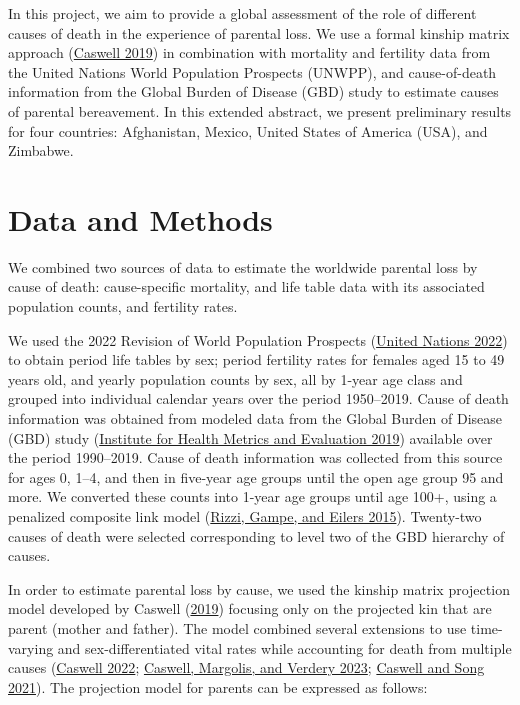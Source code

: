 \documentclass[
  11pt,
  letterpaper,
]{article}
\begin{document}
In this project, we aim to provide a global assessment of the role of different causes of death in the experience of parental loss. We use a formal kinship matrix approach (\protect\hyperlink{ref-caswell2019formal}{Caswell 2019}) in combination with mortality and fertility data from the United Nations World Population Prospects (UNWPP), and cause-of-death information from the Global Burden of Disease (GBD) study to estimate causes of parental bereavement. In this extended abstract, we present preliminary results for four countries: Afghanistan, Mexico, United States of America (USA), and Zimbabwe.

\hypertarget{data-and-methods}{%
\section{Data and Methods}\label{data-and-methods}}

We combined two sources of data to estimate the worldwide parental loss by cause of death: cause-specific mortality, and life table data with its associated population counts, and fertility rates.

We used the 2022 Revision of World Population Prospects (\protect\hyperlink{ref-united2022world}{United Nations 2022}) to obtain period life tables by sex; period fertility rates for females aged 15 to 49 years old, and yearly population counts by sex, all by 1-year age class and grouped into individual calendar years over the period 1950--2019. Cause of death information was obtained from modeled data from the Global Burden of Disease (GBD) study (\protect\hyperlink{ref-ihme2019gbd}{Institute for Health Metrics and Evaluation 2019}) available over the period 1990--2019. Cause of death information was collected from this source for ages 0, 1--4, and then in five-year age groups until the open age group 95 and more. We converted these counts into 1-year age groups until age 100+, using a penalized composite link model (\protect\hyperlink{ref-rizzi2015efficient}{Rizzi, Gampe, and Eilers 2015}). Twenty-two causes of death were selected corresponding to level two of the GBD hierarchy of causes.

In order to estimate parental loss by cause, we used the kinship matrix projection model developed by Caswell (\protect\hyperlink{ref-caswell2019formal}{2019}) focusing only on the projected kin that are parent (mother and father). The model combined several extensions to use time-varying and sex-differentiated vital rates while accounting for death from multiple causes (\protect\hyperlink{ref-caswell2022formal}{Caswell 2022}; \protect\hyperlink{ref-caswell2023formal}{Caswell, Margolis, and Verdery 2023}; \protect\hyperlink{ref-caswell2021formal}{Caswell and Song 2021}). The projection model for parents can be expressed as follows:
\end{document}
